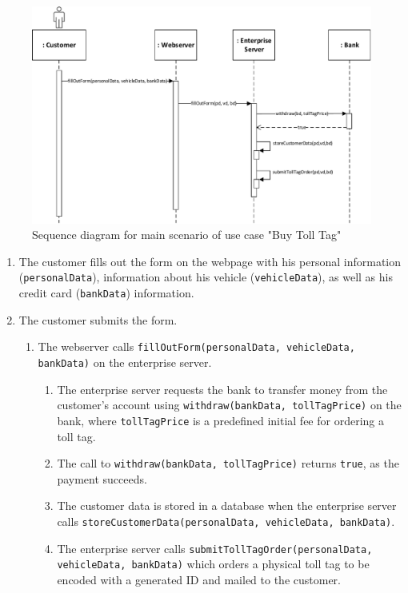 \begin{figure}[H]
\centerline{\includegraphics[width=1.4\columnwidth]{"img/sequence_diagrams/sequence_diagram_buy_toll_tag"}}
\caption{Sequence diagram for main scenario of use case "Buy Toll Tag"}
\label{fig:seq_buy_toll_tag}
\end{figure}

\begin{enumerate}
\item The customer fills out the form on the webpage with his personal information (\texttt{personalData}), information about his vehicle (\texttt{vehicleData}), as well as his credit card (\texttt{bankData}) information.
\item The customer submits the form.
	\begin{enumerate}
	\item The webserver calls \texttt{fillOutForm(personalData, vehicleData, bankData)} on the enterprise server.
		\begin{enumerate}
		\item The enterprise server requests the bank to transfer money from the customer's account using \texttt{withdraw(bankData, tollTagPrice)} on the bank, where \texttt{tollTagPrice} is a predefined initial fee for ordering a toll tag. 
		\item The call to \texttt{withdraw(bankData, tollTagPrice)} returns \texttt{true}, as the payment succeeds.
		\item The customer data is stored in a database when the enterprise server calls \texttt{storeCustomerData(personalData, vehicleData, bankData)}.
		\item The enterprise server calls \texttt{submitTollTagOrder(personalData, vehicleData, bankData)} which orders a physical toll tag to be encoded with a generated ID and mailed to the customer.
		\end{enumerate}
	\end{enumerate}
\end{enumerate}